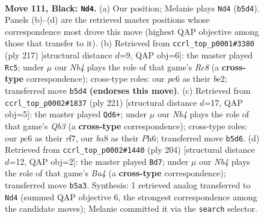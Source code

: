 \documentclass[11pt]{article}
\begin{document}
\begin{figure}[p]\centering
\begin{subfigure}{0.46\textwidth}\centering
\resizebox{\linewidth}{!}{%
\newchessgame
\chessboard[
  setfen={B7/6k1/2P5/1n4P1/6KP/8/8/8 b - - 0 111},
  showmover=false,
  pgfstyle=straightmove, color=movearrow, markmove={b5-d4}
]}
\caption{}
\end{subfigure}\hfill
\begin{subfigure}{0.46\textwidth}\centering
\resizebox{\linewidth}{!}{%
\newchessgame
\chessboard[
  setfen={5k2/8/5P2/4PK2/8/8/4B3/2r5 b - - 32 109},
  showmover=false,
  pgfstyle=straightmove, color=movearrow, markmove={c1-c5}
]}
\caption{}
\end{subfigure}
\\[4pt]
\begin{subfigure}{0.46\textwidth}\centering
\resizebox{\linewidth}{!}{%
\newchessgame
\chessboard[
  setfen={8/5R2/1q5p/8/8/7P/4k1PK/8 b - - 7 111},
  showmover=false,
  pgfstyle=straightmove, color=movearrow, markmove={b6-d6}
]}
\caption{}
\end{subfigure}\hfill
\begin{subfigure}{0.46\textwidth}\centering
\resizebox{\linewidth}{!}{%
\newchessgame
\chessboard[
  setfen={8/8/5b2/6p1/B2p3k/8/4K3/8 w - - 0 103},
  showmover=false,
  pgfstyle=straightmove, color=movearrow, markmove={a4-d7}
]}
\caption{}
\end{subfigure}
\caption{\textbf{Move 111, Black: \texttt{Nd4}.} (a) Our position; Melanie plays \texttt{Nd4} (\texttt{b5d4}). Panels (b)--(d) are the retrieved master positions whose correspondence most drove this move (highest QAP objective among those that transfer to it). (b) Retrieved from \texttt{ccrl\_top\_p0001\#3380} (ply 217) [structural distance $d$=9, QAP obj=6]: the master played \texttt{Rc5}; under $\mu$ our \emph{Nb4} plays the role of that game's \emph{Rc8} (a \textbf{cross-type} correspondence); cross-type roles: our \emph{p}c6 as their \emph{b}e2; transferred move \texttt{b5d4} \textbf{(endorses this move)}. (c) Retrieved from \texttt{ccrl\_top\_p0002\#1837} (ply 221) [structural distance $d$=17, QAP obj=5]: the master played \texttt{Qd6+}; under $\mu$ our \emph{Nb4} plays the role of that game's \emph{Qb3} (a \textbf{cross-type} correspondence); cross-type roles: our \emph{p}c6 as their \emph{r}f7, our \emph{b}a8 as their \emph{P}h6; transferred move \texttt{b5d6}. (d) Retrieved from \texttt{ccrl\_top\_p0002\#1440} (ply 204) [structural distance $d$=12, QAP obj=2]: the master played \texttt{Bd7}; under $\mu$ our \emph{Nb4} plays the role of that game's \emph{Ba4} (a \textbf{cross-type} correspondence); transferred move \texttt{b5a3}. Synthesis: 1 retrieved analog transferred to \texttt{Nd4} (summed QAP objective 6, the strongest correspondence among the candidate moves); Melanie committed it via the \texttt{search} selector.}
\label{fig:thought-m221}
\end{figure}
\end{document}
